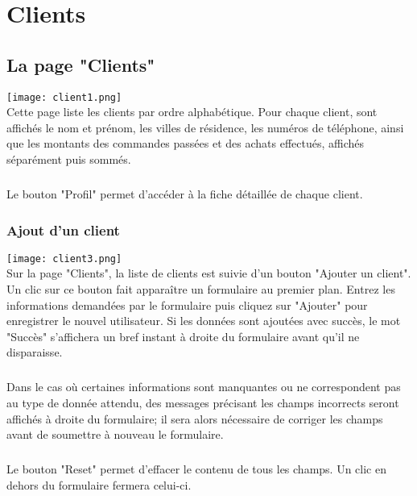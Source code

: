 \chapter{Clients}

\section{La page "Clients"}
\texttt{[image: client1.png]}\\
Cette page liste les clients par ordre alphabétique. Pour chaque client, sont
affichés le nom et prénom, les villes de résidence, les numéros de téléphone,
ainsi que les montants des commandes passées et des achats effectués, affichés
séparément puis sommés.

\paragraph{}
Le bouton "Profil" permet d'accéder à la fiche détaillée de chaque client.

\subsection{Ajout d'un client}
\texttt{[image: client3.png]}\\
Sur la page "Clients", la liste de clients est suivie d'un bouton
"Ajouter un client". Un clic sur ce bouton fait apparaître un formulaire au
premier plan. Entrez les informations demandées par le formulaire puis cliquez
sur "Ajouter" pour enregistrer le nouvel utilisateur. Si les données sont
ajoutées avec succès, le mot "Succès" s'affichera un bref instant à droite du
formulaire avant qu'il ne disparaisse.

\paragraph{}
Dans le cas où certaines informations
sont manquantes ou ne correspondent pas au type de donnée attendu, des messages
précisant les champs incorrects seront affichés à droite du formulaire; il sera
alors nécessaire de corriger les champs avant de soumettre à nouveau le
formulaire.

\paragraph{}
Le bouton "Reset" permet d'effacer le contenu de tous les champs. Un clic en
dehors du formulaire fermera celui-ci.

